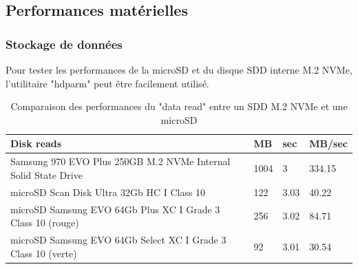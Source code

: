 ﻿\subsection{Performances matérielles}
\subsubsection{Stockage de données}
\par Pour tester les performances de la microSD et du disque SDD interne M.2 NVMe, l'utilitaire "hdparm" peut être facilement utilisé. 
{
   \vspace{0.1em} %
   \renewcommand*{\arraystretch}{1.4}
   \begin{longtable}[t]{@{}|p{25em}|p{2em}|p{2em}|p{3em}|@{}} 
      \caption{Comparaison des performances du "data read" entre un SDD M.2 NVMe et une microSD}\label{tab:Timing O_DIRECT disk reads}\\
      \hline
      \textbf{Disk reads} & \textbf{MB} & \textbf{sec} & \textbf{MB/sec}\\
      \hline
      Samsung 970 EVO Plus 250GB M.2 NVMe Internal Solid State Drive & 1004 & 3 & 334.15\\
      \hline
      microSD Scan Disk Ultra 32Gb HC I Class 10 & 122 & 3.03 & 40.22\\
      \hline
      microSD Samsung EVO 64Gb Plus XC I Grade 3 Class 10 (rouge) & 256 & 3.02 & 84.71\\
      \hline
      microSD Samsung EVO 64Gb Select XC I Grade 3 Class 10 (verte) & 92 & 3.01 & 30.54\\
      \hline
   \end{longtable}
}
